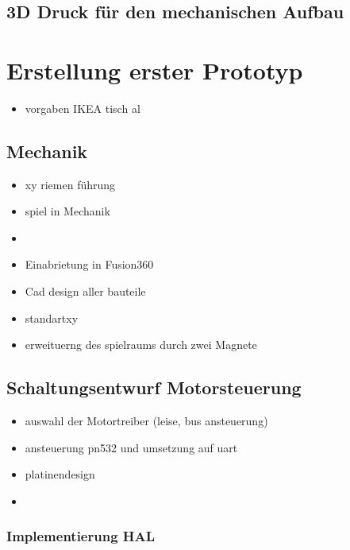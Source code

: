 \hypertarget{d-druck-fuxfcr-den-mechanischen-aufbau}{%
\subsection{3D Druck für den mechanischen
Aufbau}\label{d-druck-fuxfcr-den-mechanischen-aufbau}}

\hypertarget{erstellung-erster-prototyp}{%
\section{Erstellung erster Prototyp}\label{erstellung-erster-prototyp}}

\begin{itemize}
\tightlist
\item
  vorgaben IKEA tisch al
\end{itemize}

\hypertarget{mechanik}{%
\subsection{Mechanik}\label{mechanik}}

\begin{itemize}
\item
  xy riemen führung
\item
  spiel in Mechanik
\item
\item
  Einabrietung in Fusion360
\item
  Cad design aller bauteile
\item
  standartxy
\item
  erweituerng des spielraums durch zwei Magnete
\end{itemize}

\hypertarget{schaltungsentwurf-motorsteuerung}{%
\subsection{Schaltungsentwurf
Motorsteuerung}\label{schaltungsentwurf-motorsteuerung}}

\begin{itemize}
\item
  auswahl der Motortreiber (leise, bus ansteuerung)
\item
  ansteuerung pn532 und umsetzung auf uart
\item
  platinendesign
\item
\end{itemize}

\hypertarget{implementierung-hal}{%
\subsubsection{Implementierung HAL}\label{implementierung-hal}}

